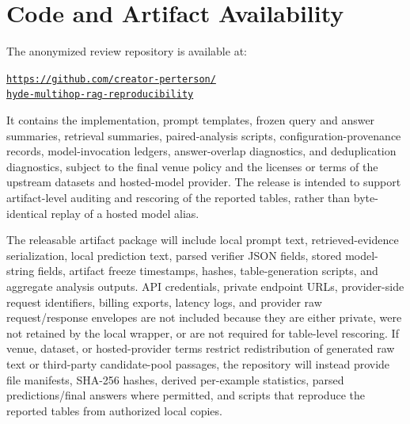 \documentclass[10pt]{article}
\begin{document}







\clearpage
\section{Code and Artifact Availability}
\label{sec:supp_code_artifact_availability}

The anonymized review repository is available at:
\begin{center}
\href{https://github.com/creator-perterson/hyde-multihop-rag-reproducibility}{\texttt{https://github.com/creator-perterson/}\\\texttt{hyde-multihop-rag-reproducibility}}
\end{center}
It contains the implementation, prompt templates, frozen query and answer summaries, retrieval summaries, paired-analysis scripts, configuration-provenance records, model-invocation ledgers, answer-overlap diagnostics, and deduplication diagnostics, subject to the final venue policy and the licenses or terms of the upstream datasets and hosted-model provider. The release is intended to support artifact-level auditing and rescoring of the reported tables, rather than byte-identical replay of a hosted model alias.

The releasable artifact package will include local prompt text, retrieved-evidence serialization, local prediction text, parsed verifier JSON fields, stored model-string fields, artifact freeze timestamps, hashes, table-generation scripts, and aggregate analysis outputs. API credentials, private endpoint URLs, provider-side request identifiers, billing exports, latency logs, and provider raw request/response envelopes are not included because they are either private, were not retained by the local wrapper, or are not required for table-level rescoring. If venue, dataset, or hosted-provider terms restrict redistribution of generated raw text or third-party candidate-pool passages, the repository will instead provide file manifests, SHA-256 hashes, derived per-example statistics, parsed predictions/final answers where permitted, and scripts that reproduce the reported tables from authorized local copies.
\end{document}
